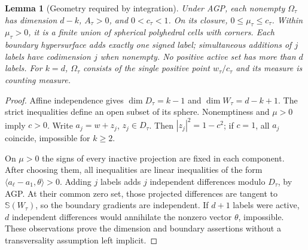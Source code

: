 \documentclass[10pt,reqno]{amsart}
\newtheorem{lemma}[theorem]{Lemma}
\theoremstyle{definition}
\theoremstyle{remark}
\newcommand{\Sphere}{\mathbb S}
\newcommand{\ip}[2]{\langle #1,#2\rangle}
\begin{document}
\begin{lemma}[Geometry required by integration]\label{lem:cell-geometry}
Under AGP, each nonempty $\Omega_\tau$ has dimension $d-k$, $A_\tau>0$, and $0<c_\tau<1$. On its closure, $0\le\mu_\tau\le c_\tau$.
Within $\mu_\tau>0$, it is a finite union of spherical polyhedral cells with corners. Each boundary hypersurface adds exactly one signed label; simultaneous additions of $j$ labels have codimension $j$ when nonempty. No positive active set has more than $d$ labels. For $k=d$, $\Omega_\tau$ consists of the single positive point $w_\tau/c_\tau$ and its measure is counting measure.
\end{lemma}
\begin{proof}
Affine independence gives $\dim D_\tau=k-1$ and $\dim W_\tau=d-k+1$. The strict inequalities define an open subset of its sphere. Nonemptiness and $\mu>0$ imply $c>0$. Write $a_j=w+z_j$, $z_j\in D_\tau$. Then $|z_j|^2=1-c^2$; if $c=1$, all $a_j$ coincide, impossible for $k\ge2$.

On $\mu>0$ the signs of every inactive projection are fixed in each component. After choosing them, all inequalities are linear inequalities of the form $\ip{a_\ell-a_1}{\theta}>0$. Adding $j$ labels adds $j$ independent differences modulo $D_\tau$, by AGP. At their common zero set, those projected differences are tangent to $\Sphere(W_\tau)$, so the boundary gradients are independent. If $d+1$ labels were active, $d$ independent differences would annihilate the nonzero vector $\theta$, impossible. These observations prove the dimension and boundary assertions without a transversality assumption left implicit.
\end{proof}
\end{document}
